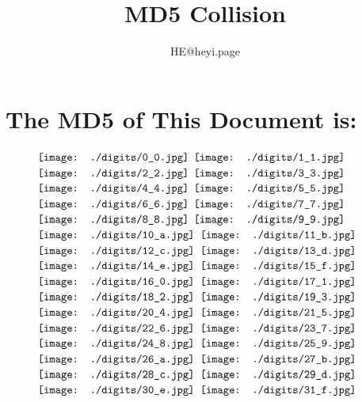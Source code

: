 \documentclass[a4paper, landscape]{paper}
\title{MD5 Collision}
\author{HE@heyi.page}
\begin{document}
\maketitle

\section*{The MD5 of This Document is:}
\begin{figure}[h]
    \noindent
    \centering
    $\vcenter{\hbox{\texttt{[image: ./digits/0\_0.jpg]}}}$
    $\vcenter{\hbox{\texttt{[image: ./digits/1\_1.jpg]}}}$
    $\vcenter{\hbox{\texttt{[image: ./digits/2\_2.jpg]}}}$
    $\vcenter{\hbox{\texttt{[image: ./digits/3\_3.jpg]}}}$
    $\vcenter{\hbox{\texttt{[image: ./digits/4\_4.jpg]}}}$
    $\vcenter{\hbox{\texttt{[image: ./digits/5\_5.jpg]}}}$
    $\vcenter{\hbox{\texttt{[image: ./digits/6\_6.jpg]}}}$
    $\vcenter{\hbox{\texttt{[image: ./digits/7\_7.jpg]}}}$
    $\vcenter{\hbox{\texttt{[image: ./digits/8\_8.jpg]}}}$
    $\vcenter{\hbox{\texttt{[image: ./digits/9\_9.jpg]}}}$
    $\vcenter{\hbox{\texttt{[image: ./digits/10\_a.jpg]}}}$
    $\vcenter{\hbox{\texttt{[image: ./digits/11\_b.jpg]}}}$
    $\vcenter{\hbox{\texttt{[image: ./digits/12\_c.jpg]}}}$
    $\vcenter{\hbox{\texttt{[image: ./digits/13\_d.jpg]}}}$
    $\vcenter{\hbox{\texttt{[image: ./digits/14\_e.jpg]}}}$
    $\vcenter{\hbox{\texttt{[image: ./digits/15\_f.jpg]}}}$
    $\vcenter{\hbox{\texttt{[image: ./digits/16\_0.jpg]}}}$
    $\vcenter{\hbox{\texttt{[image: ./digits/17\_1.jpg]}}}$
    $\vcenter{\hbox{\texttt{[image: ./digits/18\_2.jpg]}}}$
    $\vcenter{\hbox{\texttt{[image: ./digits/19\_3.jpg]}}}$
    $\vcenter{\hbox{\texttt{[image: ./digits/20\_4.jpg]}}}$
    $\vcenter{\hbox{\texttt{[image: ./digits/21\_5.jpg]}}}$
    $\vcenter{\hbox{\texttt{[image: ./digits/22\_6.jpg]}}}$
    $\vcenter{\hbox{\texttt{[image: ./digits/23\_7.jpg]}}}$
    $\vcenter{\hbox{\texttt{[image: ./digits/24\_8.jpg]}}}$
    $\vcenter{\hbox{\texttt{[image: ./digits/25\_9.jpg]}}}$
    $\vcenter{\hbox{\texttt{[image: ./digits/26\_a.jpg]}}}$
    $\vcenter{\hbox{\texttt{[image: ./digits/27\_b.jpg]}}}$
    $\vcenter{\hbox{\texttt{[image: ./digits/28\_c.jpg]}}}$
    $\vcenter{\hbox{\texttt{[image: ./digits/29\_d.jpg]}}}$
    $\vcenter{\hbox{\texttt{[image: ./digits/30\_e.jpg]}}}$
    $\vcenter{\hbox{\texttt{[image: ./digits/31\_f.jpg]}}}$
\end{figure}
\end{document}
